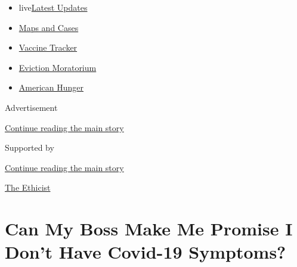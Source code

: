 \begin{itemize}
\tightlist
\item
  live\href{https://www.nytimes3xbfgragh.onion/2020/09/08/world/covid-19-coronavirus.html?name=styln-coronavirus-national\&region=TOP_BANNER\&block=storyline_menu_recirc\&action=click\&pgtype=Article\&impression_id=d14a6660-f1da-11ea-bc3d-b7a508416139\&variant=undefined}{Latest
  Updates}
\item
  \href{https://www.nytimes3xbfgragh.onion/interactive/2020/us/coronavirus-us-cases.html?name=styln-coronavirus-national\&region=TOP_BANNER\&block=storyline_menu_recirc\&action=click\&pgtype=Article\&impression_id=d14a6661-f1da-11ea-bc3d-b7a508416139\&variant=undefined}{Maps
  and Cases}
\item
  \href{https://www.nytimes3xbfgragh.onion/interactive/2020/science/coronavirus-vaccine-tracker.html?name=styln-coronavirus-national\&region=TOP_BANNER\&block=storyline_menu_recirc\&action=click\&pgtype=Article\&impression_id=d14a6662-f1da-11ea-bc3d-b7a508416139\&variant=undefined}{Vaccine
  Tracker}
\item
  \href{https://www.nytimes3xbfgragh.onion/2020/09/02/your-money/eviction-moratorium-covid.html?name=styln-coronavirus-national\&region=TOP_BANNER\&block=storyline_menu_recirc\&action=click\&pgtype=Article\&impression_id=d14a6663-f1da-11ea-bc3d-b7a508416139\&variant=undefined}{Eviction
  Moratorium}
\item
  \href{https://www.nytimes3xbfgragh.onion/interactive/2020/09/02/magazine/food-insecurity-hunger-us.html?name=styln-coronavirus-national\&region=TOP_BANNER\&block=storyline_menu_recirc\&action=click\&pgtype=Article\&impression_id=d14a6664-f1da-11ea-bc3d-b7a508416139\&variant=undefined}{American
  Hunger}
\end{itemize}

Advertisement

\protect\hyperlink{after-top}{Continue reading the main story}

Supported by

\protect\hyperlink{after-sponsor}{Continue reading the main story}

\href{/column/the-ethicist}{The Ethicist}

\hypertarget{can-my-boss-make-me-promise-i-dont-have-covid-19-symptoms}{%
\section{Can My Boss Make Me Promise I Don't Have Covid-19
Symptoms?}\label{can-my-boss-make-me-promise-i-dont-have-covid-19-symptoms}}

